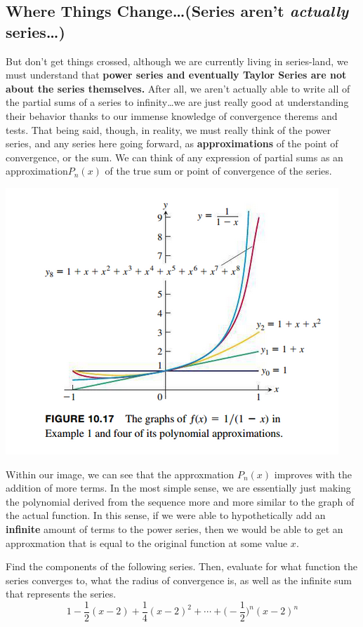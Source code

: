 \subsection{Where Things Change\dots (Series aren't \textit{actually} series\dots)}
\par But don't get things crossed, although we
are currently living in series-land, we must
understand that \textbf{power series and eventually
  Taylor Series are not about the series themselves.}
After all, we aren't actually able to write all of the
partial sums of a series to infinity\dots we are just
really good at understanding their behavior thanks to
our immense knowledge of convergence therems and tests.
That being said, though, in reality, we must really think
of the power series, and any series here going forward,
as \textbf{approximations} of the point of convergence,
or the sum. We can think of any expression of partial
sums as an approximation$ P_{n}(x) $ of the true
sum or point of convergence of the series.


\begin{center}
  \includegraphics[width = .85\textwidth]{./img/pseriesapprox.png}
\end{center}

Within our image, we can see that the approxmation $ P_{n} ( x )$
improves with the addition of more terms. In the most simple
sense, we are essentially just making the polynomial
derived from the sequence more and more similar to the
graph of the actual function. In this sense, if we were
able to hypothetically add an \textbf{infinite} amount of
terms to the power series, then we would be able to get
an approxmation that is equal to the original function at
some value $ x $.
\begin{remark*}[(2)]
  Find the components of the following series. Then, evaluate
  for what function the series converges to, what the
  radius of convergence is, as well as the infinite sum
  that represents the series.
  \[ 1 - \frac{1}{2}(x-2) + \frac{1}{4} (x-2)^{2} + \cdots
  + \Biggr( -\frac{1}{2}\Biggr)^{n} (x-2)^{n} \]
\end{remark*}

